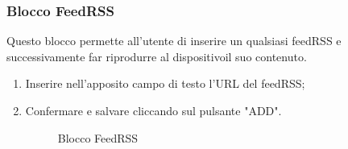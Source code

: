 \subsubsection{Blocco FeedRSS}
Questo blocco permette all'utente di inserire un qualsiasi feedRSS e successivamente far riprodurre al dispositivoil suo contenuto.
\begin{enumerate}
	\item Inserire nell'apposito campo di testo l'URL del feedRSS;
	\item Confermare e salvare cliccando sul pulsante "ADD".
\begin{figure}[!ht]
	\centering
	\caption{Blocco FeedRSS}
\end{figure}
\end{enumerate}
\newpage


